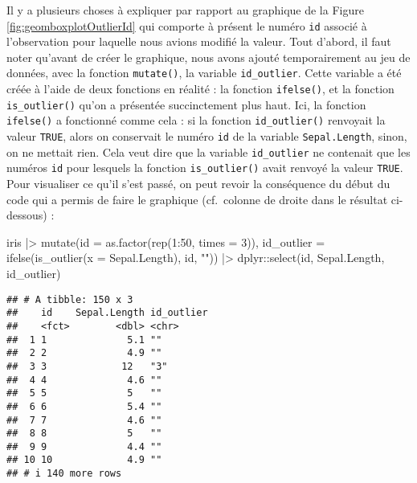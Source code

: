 \documentclass[
]{book}
\newenvironment{Shaded}{\begin{snugshade}}{\end{snugshade}}
\newcommand{\AttributeTok}[1]{\textcolor[rgb]{0.77,0.63,0.00}{#1}}
\newcommand{\DecValTok}[1]{\textcolor[rgb]{0.00,0.00,0.81}{#1}}
\newcommand{\FunctionTok}[1]{\textcolor[rgb]{0.00,0.00,0.00}{#1}}
\newcommand{\NormalTok}[1]{#1}
\newcommand{\SpecialCharTok}[1]{\textcolor[rgb]{0.00,0.00,0.00}{#1}}
\newcommand{\StringTok}[1]{\textcolor[rgb]{0.31,0.60,0.02}{#1}}
\begin{document}
Il y a plusieurs choses à expliquer par rapport au graphique de la Figure \ref{fig:geomboxplotOutlierId} qui comporte à présent le numéro \texttt{id} associé à l'observation pour laquelle nous avions modifié la valeur. Tout d'abord, il faut noter qu'avant de créer le graphique, nous avons ajouté temporairement au jeu de données, avec la fonction \texttt{mutate()}, la variable \texttt{id\_outlier}. Cette variable a été créée à l'aide de deux fonctions en réalité : la fonction \texttt{ifelse()}, et la fonction \texttt{is\_outlier()} qu'on a présentée succinctement plus haut. Ici, la fonction \texttt{ifelse()} a fonctionné comme cela : si la fonction \texttt{id\_outlier()} renvoyait la valeur \texttt{TRUE}, alors on conservait le numéro \texttt{id} de la variable \texttt{Sepal.Length}, sinon, on ne mettait rien. Cela veut dire que la variable \texttt{id\_outlier} ne contenait que les numéros \texttt{id} pour lesquels la fonction \texttt{is\_outlier()} avait renvoyé la valeur \texttt{TRUE}. Pour visualiser ce qu'il s'est passé, on peut revoir la conséquence du début du code qui a permis de faire le graphique (cf.~colonne de droite dans le résultat ci-dessous) :

\begin{Shaded}
\begin{Highlighting}[]
\NormalTok{iris }\SpecialCharTok{|\textgreater{}}
  \FunctionTok{mutate}\NormalTok{(}\AttributeTok{id =} \FunctionTok{as.factor}\NormalTok{(}\FunctionTok{rep}\NormalTok{(}\DecValTok{1}\SpecialCharTok{:}\DecValTok{50}\NormalTok{, }\AttributeTok{times =} \DecValTok{3}\NormalTok{)),}
         \AttributeTok{id\_outlier =} \FunctionTok{ifelse}\NormalTok{(}\FunctionTok{is\_outlier}\NormalTok{(}\AttributeTok{x =}\NormalTok{ Sepal.Length), id, }\StringTok{""}\NormalTok{)) }\SpecialCharTok{|\textgreater{}}
\NormalTok{  dplyr}\SpecialCharTok{::}\FunctionTok{select}\NormalTok{(id, Sepal.Length, id\_outlier)}
\end{Highlighting}
\end{Shaded}

\begin{verbatim}
## # A tibble: 150 x 3
##    id    Sepal.Length id_outlier
##    <fct>        <dbl> <chr>     
##  1 1              5.1 ""        
##  2 2              4.9 ""        
##  3 3             12   "3"       
##  4 4              4.6 ""        
##  5 5              5   ""        
##  6 6              5.4 ""        
##  7 7              4.6 ""        
##  8 8              5   ""        
##  9 9              4.4 ""        
## 10 10             4.9 ""        
## # i 140 more rows
\end{verbatim}
\end{document}
